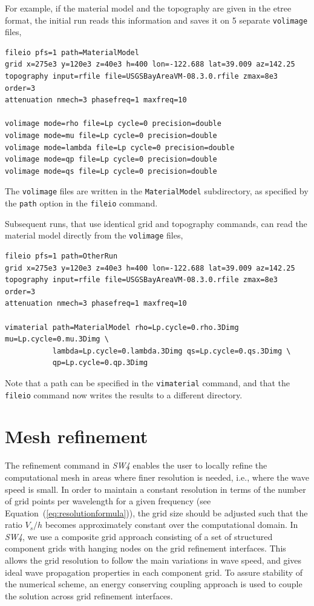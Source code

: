 \documentclass[11pt]{report}
\begin{document}
{For example, if the material model and the topography are given in the etree format, the initial run
reads this information and saves it on 5 separate \verb+volimage+ files,
\begin{verbatim}
fileio pfs=1 path=MaterialModel
grid x=275e3 y=120e3 z=40e3 h=400 lon=-122.688 lat=39.009 az=142.25
topography input=rfile file=USGSBayAreaVM-08.3.0.rfile zmax=8e3 order=3
attenuation nmech=3 phasefreq=1 maxfreq=10

volimage mode=rho file=Lp cycle=0 precision=double
volimage mode=mu file=Lp cycle=0 precision=double
volimage mode=lambda file=Lp cycle=0 precision=double
volimage mode=qp file=Lp cycle=0 precision=double
volimage mode=qs file=Lp cycle=0 precision=double
\end{verbatim}
The \verb+volimage+ files are written in the \verb+MaterialModel+ subdirectory, as specified by the
\verb+path+ option in the \verb+fileio+ command.

Subsequent runs, that use identical grid and topography commands, can read the material
model directly from the \verb+volimage+ files,
\begin{verbatim}
fileio pfs=1 path=OtherRun
grid x=275e3 y=120e3 z=40e3 h=400 lon=-122.688 lat=39.009 az=142.25
topography input=rfile file=USGSBayAreaVM-08.3.0.rfile zmax=8e3 order=3
attenuation nmech=3 phasefreq=1 maxfreq=10

vimaterial path=MaterialModel rho=Lp.cycle=0.rho.3Dimg mu=Lp.cycle=0.mu.3Dimg \
           lambda=Lp.cycle=0.lambda.3Dimg qs=Lp.cycle=0.qs.3Dimg \
           qp=Lp.cycle=0.qp.3Dimg
\end{verbatim}
Note that a path can be specified in the \verb+vimaterial+ command, and that the \verb+fileio+
command now writes the results to a different directory.

\chapter{Mesh refinement} \label{sec:mesh-ref}
\index{mesh refinement}

The refinement command in \emph{SW4} enables the user to locally refine the computational mesh in
areas where finer resolution is needed, i.e., where the wave speed is small. In order to maintain a
constant resolution in terms of the number of grid points per wavelength for a given frequency (see
Equation~(\ref{eq:resolutionformula})), the grid size should be adjusted such that the ratio $V_s/h$
becomes approximately constant over the computational domain. In \emph{SW4}, we use a composite grid
approach consisting of a set of structured component grids with hanging nodes on the grid refinement
interfaces. This allows the grid resolution to follow the main variations in wave speed, and gives
ideal wave propagation properties in each component grid. To assure stability of the numerical
scheme, an energy conserving coupling approach is used to couple the solution across grid refinement
interfaces.

}
\end{document}
